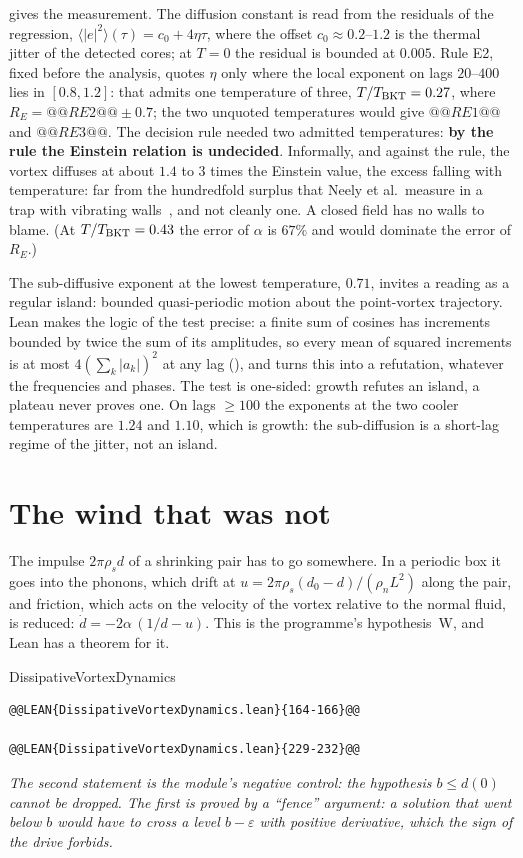  gives the measurement. The diffusion constant is read from the residuals of the regression, $\langle|e|^2\rangle(\tau)=c_0+4\eta\tau$, where the offset $c_0\approx0.2$--$1.2$ is the thermal jitter of the detected cores; at $T=0$ the residual is bounded at $0.005$. Rule E2, fixed before the analysis, quotes $\eta$ only where the local exponent on lags $20$--$400$ lies in $[0.8,1.2]$: that
admits one temperature of three, $T/T_{\rm BKT}=0.27$, where $R_E=@@RE2@@\pm0.7$; the two unquoted temperatures would give $@@RE1@@$ and $@@RE3@@$. The decision rule needed two admitted temperatures: \textbf{by the rule the Einstein relation is undecided}. Informally, and against the rule, the vortex diffuses at about $1.4$ to $3$ times the Einstein value, the excess falling with temperature: far from
the hundredfold surplus that Neely et al.\ measure in a trap with vibrating walls~\cite{Neely2024}, and not cleanly one. A closed field has no walls to blame. (At $T/T_{\rm BKT}=0.43$ the error of $\alpha$ is $67\%$ and would dominate the error of $R_E$.)

The sub-diffusive exponent at the lowest temperature, $0.71$, invites a reading as a regular island: bounded quasi-periodic motion about the point-vortex trajectory. Lean makes the logic of the test precise: a finite sum of cosines has increments bounded by twice the sum of its amplitudes, so every mean of squared increments is at most $4(\sum_k|a_k|)^2$ at any lag
(), and  turns this into a refutation, whatever the frequencies and phases. The test is one-sided: growth refutes an island, a plateau never proves one. On lags $\ge100$ the exponents at the two cooler temperatures are $1.24$ and $1.10$, which is growth: the sub-diffusion is a short-lag regime of the jitter, not an island.

\section{The wind that was not}\label{ch07:wind}

The impulse $2\pi\rho_sd$ of a shrinking pair has to go somewhere. In a periodic box it goes into the phonons, which drift at $u=2\pi\rho_s(d_0-d)/(\rho_nL^2)$ along the pair, and friction, which acts on the velocity of the vortex relative to the normal fluid, is reduced: $\dot d=-2\alpha\,(1/d-u)$. This is the programme's hypothesis~W, and Lean has a theorem for it.

\begin{leanbox}{DissipativeVortexDynamics}
\begin{lstlisting}[style=lean,basicstyle=\ttfamily\footnotesize]
@@LEAN{DissipativeVortexDynamics.lean}{164-166}@@

@@LEAN{DissipativeVortexDynamics.lean}{229-232}@@
\end{lstlisting}
\nopagebreak[4]\smallskip\noindent\textit{The second statement is the module's negative control: the hypothesis $b\le d(0)$ cannot be dropped. The first is proved by a ``fence'' argument: a solution that went below $b$ would have to cross a level $b-\varepsilon$ with positive derivative, which the sign of the drive forbids.}
\end{leanbox}

